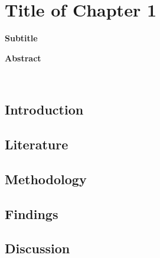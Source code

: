 \chapter{Title of Chapter 1} \label{cha:ch1}
{\noindent \Large \textbf{Subtitle}}
\vspace{1cm}



\therule
\centerline{\textbf{Abstract}} \\
 \par
\therule

\section{Introduction} \label{sec:ch1_introduction}
    

\section{Literature} \label{sec:ch1_literature}


\section{Methodology} \label{sec:ch1_methodology}
    
    
\section{Findings} \label{sec:ch1_findings}
    

\section{Discussion}  \label{sec:ch1_discussion}
    
    
